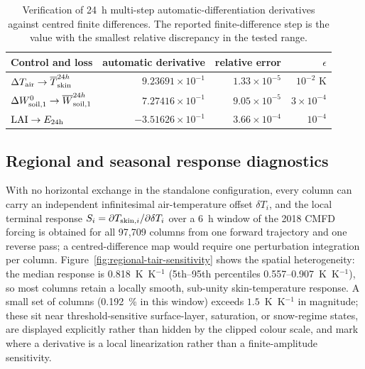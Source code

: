 \begin{table}[t]
\caption{Verification of 24~h multi-step automatic-differentiation
derivatives against centred finite differences. The reported finite-difference
step is the value with the smallest relative discrepancy in the tested range.}
\label{tab:gradient-verification}
\centering
\small
\begin{tabular}{lrrr}
\hline
Control and loss & automatic derivative & relative error & $\epsilon$ \\
\hline
$\Delta T_{\rm air}\rightarrow \overline{T}_{\rm skin}^{24h}$ & $9.23691\times10^{-1}$ & $1.33\times10^{-5}$ & $10^{-2}$ K \\
$\Delta W_{\rm soil,1}^{0}\rightarrow \overline{W}_{\rm soil,1}^{24h}$ & $7.27416\times10^{-1}$ & $9.05\times10^{-5}$ & $3\times10^{-4}$ \\
$\mathrm{LAI}\rightarrow E_{\rm 24h}$ & $-3.51626\times10^{-1}$ & $3.66\times10^{-4}$ & $10^{-4}$ \\
\hline
\end{tabular}
\end{table}

\subsection{Regional and seasonal response diagnostics}
\label{sec:regional-response}

With no horizontal exchange in the standalone configuration, every column can
carry an independent infinitesimal air-temperature offset $\delta T_i$, and
the local terminal response
$S_i = \partial T_{{\rm skin},i}/\partial\delta T_i$ over a 6~h window of the
2018 CMFD forcing is obtained for all 97{,}709 columns from one forward
trajectory and one reverse pass; a centred-difference map would require one
perturbation integration per column. Figure~\ref{fig:regional-tair-sensitivity}
shows the spatial heterogeneity: the median response is
0.818~K~K$^{-1}$ (5th--95th percentiles 0.557--0.907~K~K$^{-1}$), so most
columns retain a locally smooth, sub-unity skin-temperature response. A small
set of columns (0.192~\% in this window) exceeds $1.5$~K~K$^{-1}$ in
magnitude; these sit near threshold-sensitive surface-layer, saturation, or
snow-regime states, are displayed explicitly rather than hidden by the
clipped colour scale, and mark where a derivative is a local linearization
rather than a finite-amplitude sensitivity.

